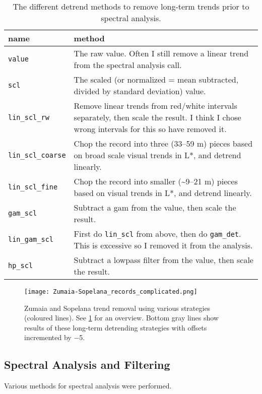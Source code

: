 \documentclass[draft]{agujournal2019}
\begin{document}
\begin{table}[htbp]
\caption{\label{tab:detrend_types}The different detrend methods to remove long-term trends prior to spectral analysis.}
\centering
\begin{tabular}{ll}
  name & method\\[0pt]
  \hline
  \texttt{value} & The raw value. Often I still remove a linear trend from the spectral analysis call.\\[0pt]
  \texttt{scl} & The scaled (or normalized = mean subtracted, divided by standard deviation) value.\\[0pt]
  \texttt{lin\_scl\_rw} & Remove linear trends from red/white intervals separately, then scale the result. I think I chose wrong intervals for this so have removed it.\\[0pt]
  \texttt{lin\_scl\_coarse} & Chop the record into three (33--59 m) pieces based on broad scale visual trends in L*, and detrend linearly.\\[0pt]
  \texttt{lin\_scl\_fine} & Chop the record into smaller (\textasciitilde{}9--21 m) pieces based on visual trends in L*, and detrend linearly.\\[0pt]
  \texttt{gam\_scl} & Subtract a gam from the value, then scale the result.\\[0pt]
  \texttt{lin\_gam\_scl} & First do \texttt{lin\_scl} from above, then do \texttt{gam\_det}. This is excessive so I removed it from the analysis.\\[0pt]
  \texttt{hp\_scl} & Subtract a lowpass filter from the value, then scale the result.\\[0pt]
\end{tabular}
\end{table}

\begin{figure}[htbp]
  \centering
  \texttt{[image: Zumaia-Sopelana\_records\_complicated.png]}
  \caption{\label{fig:detrend}Zumaia and Sopelana trend removal using various
    strategies (coloured lines). See \cref{tab:detrend_types} for an overview.
    Bottom gray lines show results of these long-term detrending strategies
    with offsets incremented by \num{-5}.}
\end{figure}

\subsection{Spectral Analysis and Filtering}\label{sec:spectral}

Various methods for spectral analysis were performed.
\end{document}
